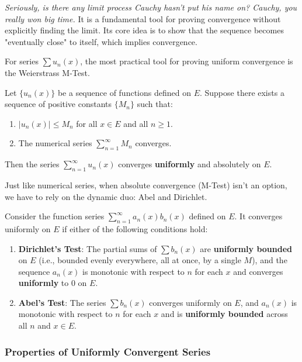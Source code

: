 \textit{Seriously, is there any limit process Cauchy hasn't put his name on? Cauchy, you really won big time.} It is a fundamental tool for proving convergence without explicitly finding the limit. Its core idea is to show that the sequence becomes "eventually close" to itself, which implies convergence.

For series $\sum u_n(x)$, the most practical tool for proving uniform convergence is the Weierstrass M-Test.

\begin{theorem}
Let $\{u_n(x)\}$ be a sequence of functions defined on $E$. Suppose there exists a sequence of positive constants $\{M_n\}$ such that:
\begin{enumerate}
    \item $|u_n(x)| \le M_n$ for all $x \in E$ and all $n \ge 1$.
    \item The numerical series $\sum_{n=1}^{\infty} M_n$ converges.
\end{enumerate}
Then the series $\sum_{n=1}^{\infty} u_n(x)$ converges \textbf{uniformly} and absolutely on $E$.
\end{theorem}

Just like numerical series, when absolute convergence (M-Test) isn't an option, we have to rely on the dynamic duo: Abel and Dirichlet.

\begin{theorem}
Consider the function series $\sum_{n=1}^{\infty} a_n(x) b_n(x)$ defined on $E$. It converges uniformly on $E$ if either of the following conditions hold:
\begin{enumerate}
    \item \textbf{Dirichlet's Test}: The partial sums of $\sum b_n(x)$ are \textbf{uniformly bounded} on $E$ (i.e., bounded evenly everywhere, all at once, by a single $M$), and the sequence $a_n(x)$ is monotonic with respect to $n$ for each $x$ and converges \textbf{uniformly} to $0$ on $E$.
    \item \textbf{Abel's Test}: The series $\sum b_n(x)$ converges uniformly on $E$, and $a_n(x)$ is monotonic with respect to $n$ for each $x$ and is \textbf{uniformly bounded} across all $n$ and $x \in E$.
\end{enumerate}
\end{theorem}


\subsubsection{Properties of Uniformly Convergent Series}

